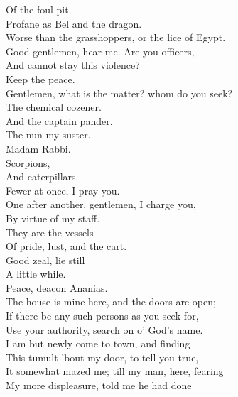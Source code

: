 \documentclass[a4paper,oneside]{memoir}
\begin{document}
\begin{drama*}
Of the foul pit.\\
\tribulationspeaks {} Profane as Bel and the dragon.\\
\ananiasspeaks Worse than the grasshoppers, or the lice of Egypt.\\
\lovewitspeaks Good gentlemen, hear me. Are you officers,\\
And cannot stay this violence?\\
\officeronespeaks {} Keep the peace.\\
\lovewitspeaks Gentlemen, what is the matter? whom do you seek?\\
\mammonspeaks The chemical cozener.\\
\surlyspeaks {} And the captain pander.\\
\kastrilspeaks The nun my suster.\\
\mammonspeaks {} Madam Rabbi.\\
\ananiasspeaks {} Scorpions,\\
And caterpillars.\\
\lovewitspeaks {} Fewer at once, I pray you.\\
\officertwospeaks One after another, gentlemen, I charge you,\\
By virtue of my staff.\\
\ananiasspeaks {} They are the vessels\\
Of pride, lust, and the cart.\\
\lovewitspeaks {} Good zeal, lie still\\
A little while.\\
\tribulationspeaks {} Peace, deacon Ananias.\\
\lovewitspeaks The house is mine here, and the doors are open;\\
If there be any such persons as you seek for,\\
Use your authority, search on o' God's name.\\
I am but newly come to town, and finding\\
This tumult 'bout my door, to tell you true,\\
It somewhat mazed me; till my man, here, fearing\\
My more displeasure, told me he had done\\

\end{drama*}
\end{document}
